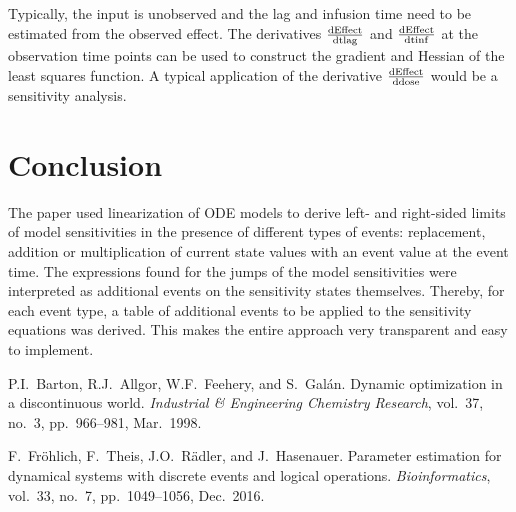 \documentclass[journal, a4paper]{IEEEtran}
\begin{document}
Typically, the input is unobserved and the lag and infusion time need to be estimated from the observed effect. The derivatives $\frac{\rm dEffect}{\rm dtlag}$ and $\frac{\rm dEffect}{\rm dtinf}$ at the observation time points can be used to construct the gradient and Hessian of the least squares function. A typical application of the derivative $\frac{\rm dEffect}{\rm ddose}$ would be a sensitivity analysis.



\section{Conclusion}
The paper used linearization of ODE models to derive left- and right-sided limits of model sensitivities in the presence of different types of events: replacement, addition or multiplication of current state values with an event value at the event time. The expressions found for the jumps of the model sensitivities were interpreted as additional events on the sensitivity states themselves. Thereby, for each event type, a table of additional events to be applied to the sensitivity equations was derived. This makes the entire approach very transparent and easy to implement.

\begin{thebibliography}{9}

	P.I.~Barton, R.J.~Allgor, W.F.~Feehery, and S.~Galán. Dynamic optimization in a discontinuous world. {\em Industrial \& Engineering Chemistry Research}, vol.~37, no.~3, pp.~966--981, Mar.~1998.
	
	F.~Fr{\"o}hlich, F.~Theis, J.O.~R{\"a}dler, and J.~Hasenauer. Parameter estimation for dynamical systems with discrete events and logical operations. {\em Bioinformatics}, vol.~33, no.~7, pp.~1049--1056, Dec.~2016.
	
	
\end{thebibliography}

\end{document}

